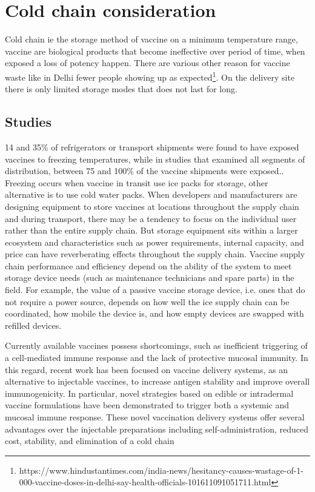 \documentclass{article}
\begin{document}
\section{Cold chain consideration}

Cold chain ie the storage method of vaccine on a minimum temperature range, vaccine are biological products that become ineffective over period of time, when exposed a loss of potency happen. There are various other reason for vaccine waste like in Delhi fewer people showing up as expected\footnote{https://www.hindustantimes.com/india-news/hesitancy-causes-wastage-of-1-000-vaccine-doses-in-delhi-say-health-officials-101611091051711.html}. On the delivery site there is only limited storage modes that does not last for long.

\subsection{Studies}

 14 and 35\% of refrigerators or transport shipments were found to have exposed vaccines to freezing temperatures, while in studies that examined all segments of distribution, between 75 and 100\% of the vaccine shipments were exposed.\cite{kartoglu2014tools}. Freezing occurs when vaccine in transit use ice packs for storage, other alternative is to use cold water packs. When developers and manufacturers are designing equipment to store vaccines at locations throughout the supply chain and during transport, there may be a tendency to focus on the individual user rather than the entire supply chain. But storage equipment sits within a larger ecosystem and characteristics such as power requirements, internal capacity, and price can have reverberating effects throughout the supply chain. Vaccine supply chain performance and efficiency depend on the ability of the system to meet storage device needs (such as maintenance technicians and spare parts) in the field. For example, the value of a passive vaccine storage device, i.e. ones that do not require a power source, depends on how well the ice supply chain can be coordinated, how mobile the device is, and how empty devices are swapped with refilled devices.\cite{lee2017importance}
 
  Currently available vaccines possess shortcomings, such as inefficient triggering of a cell-mediated immune response and the lack of protective mucosal immunity. In this regard, recent work has been focused on vaccine delivery systems, as an alternative to injectable vaccines, to increase antigen stability and improve overall immunogenicity. In particular, novel strategies based on edible or intradermal vaccine formulations have been demonstrated to trigger both a systemic and mucosal immune response. These novel vaccination delivery systems offer several advantages over the injectable preparations including self-administration, reduced cost, stability, and elimination of a cold chain \cite{criscuolo2019alternative}
 
\end{document}
